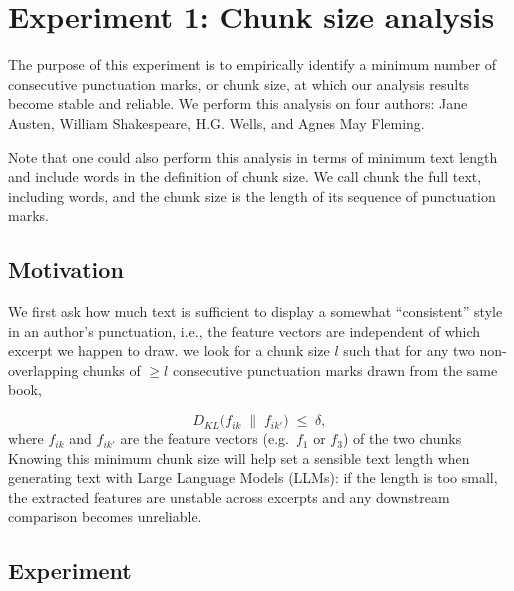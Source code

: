 \documentclass{article}
\begin{document}
\section{Experiment 1: Chunk size analysis}

The purpose of this experiment is to empirically identify a minimum number of consecutive punctuation marks, or chunk size, at which our analysis results become stable and reliable. We perform this analysis on four authors: Jane Austen, William Shakespeare, H.G. Wells, and Agnes May Fleming.


Note that one could also perform this analysis in terms of minimum text length and include words in the definition of chunk size. We call chunk the full text, including words, and the chunk size is the length of its sequence of punctuation marks.



\subsection{Motivation}

We first ask how much text is sufficient to display a somewhat ``consistent'' style in an author's punctuation, i.e., the feature vectors are independent of which excerpt we happen to draw. we look for a chunk size $l$ such that for any two non-overlapping chunks of $\geq l$ consecutive punctuation marks drawn from the same book,

\[
D_{KL}\!\bigl(f_{ik} \;\|\; f_{ik'}\bigr) \;\leq\; \delta,
\]
where $f_{ik}$ and $f_{ik'}$ are the feature vectors (e.g.\ $f_1$ or $f_3$) of the two chunks\\

Knowing this minimum chunk size will help set a sensible text length when generating text with Large Language Models (LLMs): if the length is too small, the extracted features are unstable across excerpts and any downstream comparison becomes unreliable.


\subsection{Experiment}
\end{document}
